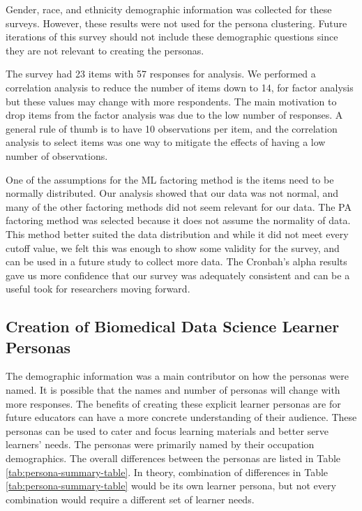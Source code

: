 \documentclass[020-persona\_validation.tex]{subfiles}
\begin{document}
        Gender, race, and ethnicity demographic information was collected for these surveys.
        However, these results were not used for the persona clustering.
        Future iterations of this survey should not include these
        demographic questions since they are not relevant to creating the personas.

        The survey had 23 items with 57 responses for analysis.
        We performed a correlation analysis to reduce the number of items down to 14, for factor analysis
        but these values may change with more respondents.
        The main motivation to drop items from the factor analysis was due to the low number of responses.
        A general rule of thumb is to have 10 observations per item,
        and the correlation analysis to select items was one way to mitigate the effects of having a low number of observations.

        One of the assumptions for the ML factoring method is the items need to be normally distributed.
        Our analysis showed that our data was not normal,
        and many of the other factoring methods did not seem relevant for our data.
        The PA factoring method was selected because it does not assume the normality of data.
        This method better suited the data distribution and
        while it did not meet every cutoff value,
        we felt this was enough to show some validity for the survey,
        and can be used in a future study to collect more data.
        The Cronbah's alpha results gave us more confidence that our survey was adequately consistent and
        can be a useful took for researchers moving forward.

    \subsection{Creation of Biomedical Data Science Learner Personas}

        The demographic information was a main contributor on how the personas were named.
        It is possible that the names and number of personas will change with more responses.
        The benefits of creating these explicit learner personas are for future educators
        can have a more concrete understanding of their audience.
        These personas can be used to cater and focus learning materials and better serve learners' needs.
        The personas were primarily named by their occupation demographics.
        The overall differences between the personas are listed in Table \ref{tab:persona-summary-table}.
        In theory, combination of differences in Table \ref{tab:persona-summary-table} would be its own learner persona,
        but not every combination would require a different set of learner needs.
\end{document}
